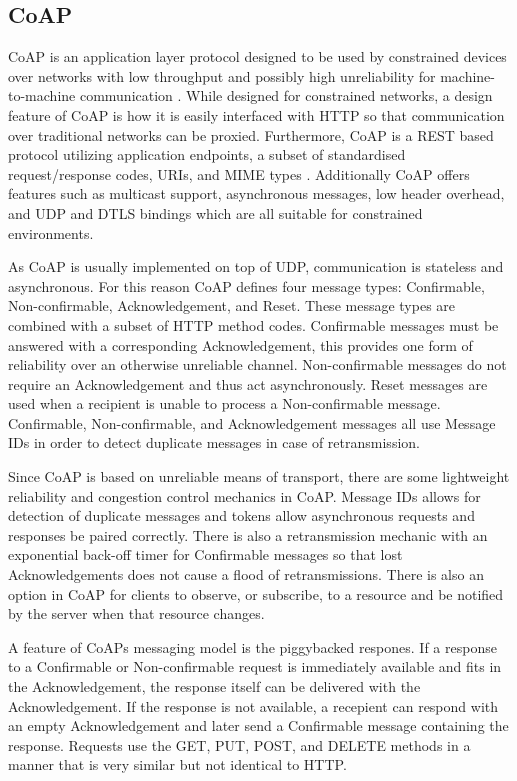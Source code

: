 \documentclass[0-thesis.tex]{subfiles}
\begin{document}
\subsection{CoAP}
\label{ssec:coap}
CoAP is an application layer protocol designed to be used by constrained devices over networks
with low throughput and possibly high unreliability for machine-to-machine communication
\parencite{rfc7252}. While designed for constrained networks, a design feature of CoAP is
how it is easily interfaced with HTTP so that communication over traditional networks can
be proxied. Furthermore, CoAP is a REST based protocol utilizing application endpoints, a
subset of standardised request/response codes, URIs, and MIME types \parencite{rest}.
Additionally CoAP offers features such as multicast support, asynchronous messages, low
header overhead, and UDP and DTLS bindings which are all suitable for constrained
environments.

As CoAP is usually implemented on top of UDP, communication is stateless and asynchronous.
For this reason CoAP defines four message types: Confirmable, Non-confirmable,
Acknowledgement, and Reset. These message types are combined with a subset of HTTP method
codes. Confirmable messages must be answered with a corresponding Acknowledgement, this
provides one form of reliability over an otherwise unreliable channel. Non-confirmable
messages do not require an Acknowledgement and thus act asynchronously. Reset messages are
used when a recipient is unable to process a Non-confirmable message. Confirmable,
Non-confirmable, and Acknowledgement messages all use Message IDs in order to detect
duplicate messages in case of retransmission.

Since CoAP is based on unreliable means of transport, there are some lightweight
reliability and congestion control mechanics in CoAP. Message IDs allows for detection of
duplicate messages and tokens allow asynchronous requests and responses be paired
correctly. There is also a retransmission mechanic with an exponential back-off timer for
Confirmable messages so that lost Acknowledgements does not cause a flood of
retransmissions. There is also an option in CoAP for clients to observe, or subscribe, to
a resource and be notified by the server when that resource changes.

A feature of CoAPs messaging model is the piggybacked respones. If a response to a
Confirmable or Non-confirmable request is immediately available and fits in the
Acknowledgement, the response itself can be delivered with the Acknowledgement. If the
response is not available, a recepient can respond with an empty Acknowledgement and later
send a Confirmable message containing the response. Requests use the GET, PUT, POST, and
DELETE methods in a manner that is very similar but not identical to HTTP.
\end{document}
